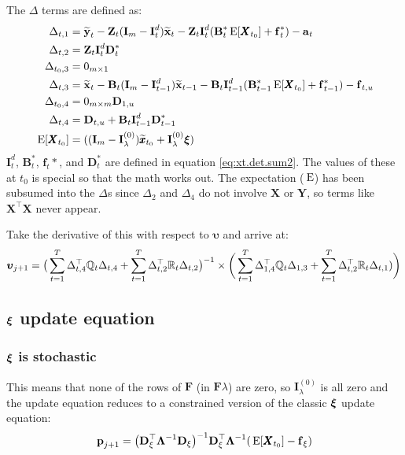 \documentclass[]{article}
\def\uupsilon{\pmb{\upsilon}}
\def\xixi{\mbox{\boldmath $\xi$}}
\def\LAM{\mbox{\boldmath $\Lambda$}}
\def\UPS{\mbox{\boldmath $\Upsilon$}}
\def\XI{\mbox{\boldmath $\Xi$}}
\def\BB{\mbox{$\mathbf B$}}	\def\bb{\mbox{$\mathbf b$}} \def\Bb{\mbox{$\mathbf J$}} \def\Ba{\mbox{$\mathbf L$}} \def\Bm{\UPS}
\def\DD{\mbox{$\mathbf D$}}	\def\dd{\mbox{$\mathbf d$}}
\def\E{\,\textup{\textrm{E}}}
\def\FF{\mbox{$\mathbf F$}} \def\ff{\mbox{$\mathbf f$}}
\def\II{\mbox{$\mathbf I$}} \def\ii{\mbox{$\mathbf i$}}
\def\XX{\mbox{$\pmb{X}$}}	\def\xx{\mbox{$\pmb{x}$}}
\def\YY{\mbox{$\pmb{Y}$}}	\def\yy{\mbox{$\pmb{y}$}}
\def\ZZ{\mbox{$\mathbf Z$}}	\def\zz{\mbox{$\mathbf z$}}	\def\Zb{\mbox{$\mathbf M$}} \def\Za{\mbox{$\mathbf N$}} \def\Zm{\XI}
\def\hatxt{\widetilde{\mbox{$\mathbf x$}}_t}
\def\hatxtm{\widetilde{\mbox{$\mathbf x$}}_{t-1}}
\def\hatyt{\widetilde{\mbox{$\mathbf y$}}_t}
\begin{document}
The $\Delta$ terms are defined as:
\begin{equation}\label{eq:degen.u.update.Deltas}
\begin{split}
\Delta_{t,1}&=\hatyt - \ZZ_t(\II_m - \II_t^d)\hatxt - \ZZ_t\II_t^{d}(\BB^*_t\E[\XX_{t_0}] + \ff^*_t) - \aa_t \\
\Delta_{t,2}&= \ZZ_t\II_t^{d}\DD^*_t \\
\Delta_{t_0,3}&=0_{m\times 1} \\
\Delta_{t,3}&=\hatxt - \BB_t(\II_m - \II_{t-1}^d)\hatxtm - \BB_t\II_{t-1}^{d}(\BB^*_{t-1} \E[\XX_{t_0}] + \ff^*_{t-1}) - \ff_{t,u} \\
\Delta_{t_0,4}&=0_{m\times m} \DD_{1,u} \\
\Delta_{t,4}&=\DD_{t,u}+\BB_t\II_{t-1}^{d}\DD^*_{t-1} \\
\E[\XX_{t_0}]&=((\II_m-\II_\lambda^{(0)})\widetilde{\xx}_{t_0}+\II_\lambda^{(0)} \xixi)
\end{split}
\end{equation}
$\II^d_t$, $\BB_t^*$, $\ff_t*$, and $\DD_t^*$ are defined in equation \ref{eq:xt.det.sum2}.  The values of these at $t_0$ is special so that the math works out. The expectation ($\E$) has been subsumed into the $\Delta$s since $\Delta_2$ and $\Delta_4$ do not involve $\XX$ or $\YY$, so terms like $\XX^\top\XX$ never appear.

Take the derivative of this with respect to $\uupsilon$ and arrive at:
\begin{equation}
\begin{split}
\label{eq:p.degen.update.u}
\uupsilon_{j+1} = \big(\sum_{t=1}^T\Delta_{t,4}^\top\Qm_t\Delta_{t,4} + \sum_{t=1}^T\Delta_{t,2}^\top\Rm_t\Delta_{t,2}\big)^{-1} \times
 \bigg(\sum_{t=1}^T\Delta_{1,4}^\top\Qm_t\Delta_{1,3} + \sum_{t=1}^T \Delta_{t,2}^\top\Rm_t\Delta_{t,1})\bigg)
\end{split}
\end{equation}

\subsection{$\xixi$ update equation}

\subsubsection{$\xixi$ is stochastic}
This means that none of the rows of $\FF$ (in $\FF\lambda$)  are zero, so $\II_\lambda^{(0)}$ is all zero and the update equation reduces to a constrained version of the classic $\xixi$ update equation:
\begin{equation}
\label{eq:p.degen.update.x0.0.a}
\pp_{j+1} = \big(\DD_\xi^\top\LAM^{-1}\DD_\xi\big)^{-1}\DD_\xi^\top\LAM^{-1}(\E[\XX_{t_0}] - \ff_\xi)
\end{equation}
\end{document}
